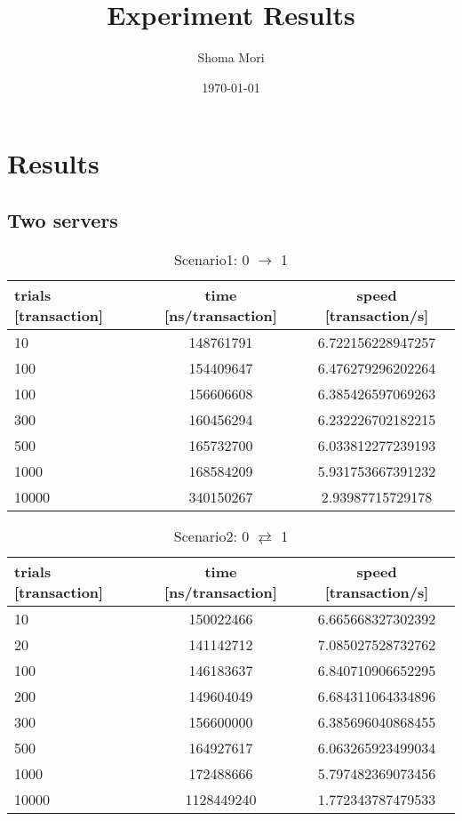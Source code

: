 \documentclass[a4j,11pt,uplatex,onecolumn]{article}
\title{Experiment Results}
\author{Shoma Mori}
\date{\today}
\begin{document}
\maketitle

\section{Results}

\subsection{Two servers}
\begin{table}[htb]
  \begin{center}
    \caption{Scenario1: 0 $\rightarrow$ 1}
    \begin{tabular}{|l|c|c|} \hline
        trials [transaction] & time [ns/transaction] & speed [transaction/s]\\ \hline \hline
        10 & 148761791 & 6.722156228947257\\
        100 & 154409647 & 6.476279296202264\\
        100 & 156606608 & 6.385426597069263\\ 
        300 & 160456294 & 6.232226702182215\\
        500 & 165732700 & 6.033812277239193\\
        1000 & 168584209 & 5.931753667391232\\
        10000 & 340150267 & 2.93987715729178\\ \hline
    \end{tabular}
  \end{center}
\end{table}

\begin{table}[htb]
  \begin{center}
    \caption{Scenario2: 0 $\rightleftarrows$ 1}
    \begin{tabular}{|l|c|c|} \hline
        trials [transaction] & time [ns/transaction] & speed [transaction/s]\\ \hline \hline
        10 & 150022466 & 6.665668327302392\\
        20 & 141142712 & 7.085027528732762\\
        100 & 146183637 & 6.840710906652295\\
        200 & 149604049 & 6.684311064334896\\
        300 & 156600000 & 6.385696040868455\\
        500 & 164927617 & 6.063265923499034\\
        1000 & 172488666 & 5.797482369073456\\
        10000 & 1128449240 & 1.772343787479533\\ \hline
    \end{tabular}
  \end{center}
\end{table}
\end{document}
